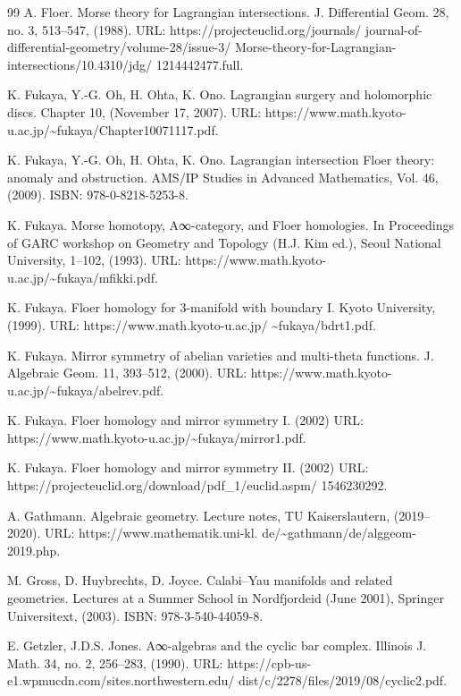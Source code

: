\begin{thebibliography}{99}
 A. Floer. Morse theory for Lagrangian intersections. J. Differential Geom. 28, no. 3, 513–547, (1988). URL: https://projecteuclid.org/journals/ journal-of-differential-geometry/volume-28/issue-3/ Morse-theory-for-Lagrangian-intersections/10.4310/jdg/ 1214442477.full.

 K. Fukaya, Y.-G. Oh, H. Ohta, K. Ono. Lagrangian surgery and holomorphic discs. Chapter 10, (November 17, 2007). URL: https://www.math.kyoto-u.ac.jp/\textasciitilde{}fukaya/Chapter10071117.pdf.

 K. Fukaya, Y.-G. Oh, H. Ohta, K. Ono. Lagrangian intersection Floer theory: anomaly and obstruction. AMS/IP Studies in Advanced Mathematics, Vol. 46, (2009). ISBN: 978-0-8218-5253-8.

 K. Fukaya. Morse homotopy, A∞-category, and Floer homologies. In Proceedings of GARC workshop on Geometry and Topology (H.J. Kim ed.), Seoul National University, 1–102, (1993). URL: https://www.math.kyoto-u.ac.jp/\textasciitilde{}fukaya/mfikki.pdf.

 K. Fukaya. Floer homology for 3-manifold with boundary I. Kyoto University, (1999). URL: https://www.math.kyoto-u.ac.jp/ \textasciitilde{}fukaya/bdrt1.pdf.

 K. Fukaya. Mirror symmetry of abelian varieties and multi-theta functions. J. Algebraic Geom. 11, 393–512, (2000). URL: https://www.math.kyoto-u.ac.jp/\textasciitilde{}fukaya/abelrev.pdf.

 K. Fukaya. Floer homology and mirror symmetry I. (2002) URL: https://www.math.kyoto-u.ac.jp/\textasciitilde{}fukaya/mirror1.pdf.

 K. Fukaya. Floer homology and mirror symmetry II. (2002) URL: https://projecteuclid.org/download/pdf\_1/euclid.aspm/ 1546230292.

 A. Gathmann. Algebraic geometry. Lecture notes, TU Kaiserslautern, (2019–2020). URL: https://www.mathematik.uni-kl. de/\textasciitilde{}gathmann/de/alggeom-2019.php.

 M. Gross, D. Huybrechts, D. Joyce. Calabi–Yau manifolds and related geometries. Lectures at a Summer School in Nordfjordeid (June 2001), Springer Universitext, (2003). ISBN: 978-3-540-44059-8.

 E. Getzler, J.D.S. Jones. A∞-algebras and the cyclic bar complex. Illinois J. Math. 34, no. 2, 256–283, (1990). URL: https://cpb-us-e1.wpmucdn.com/sites.northwestern.edu/ dist/c/2278/files/2019/08/cyclic2.pdf.


\end{thebibliography}
